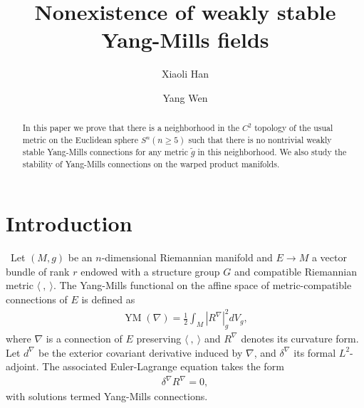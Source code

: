 \documentclass{amsart}
\begin{document}
	\title{Nonexistence of weakly stable Yang-Mills fields}
	\author{Xiaoli Han}
	\address{Xiaoli Han\\ Math department of Tsinghua university\\ Beijing\\ 100084\\ China\\} 
	\author{Yang Wen}
	\address{Yang Wen\\ Beijing International Center for Mathematical Research\\ Peking University\\ Beijing\\ 100871\\ China\\} 
	\begin{abstract}
		In this paper we prove that there is a neighborhood in the  $C^2$ topology of the usual metric on the
		Euclidean sphere $S^n (n\geq 5)$ such that there is no nontrivial weakly stable Yang-Mills connections for any metric $\tilde{g}$ in this neighborhood. We also study the stability of Yang-Mills connections on the warped product manifolds.
	\end{abstract}
	\maketitle
	\section{Introduction}\  
	Let $(M,g)$ be an $n$-dimensional Riemannian manifold and $E\to M$ a vector bundle of rank $r$ endowed with a structure group $G$ and compatible Riemannian metric $\langle\ ,\ \rangle$. The Yang-Mills functional on the affine space of metric-compatible connections of $E$ is defined as
	\begin{align*}
		\operatorname{YM}(\nabla)=\frac12\int_M|R^\nabla|_g^2dV_g,
	\end{align*}
	where $\nabla$ is a connection of $E$ preserving $\langle\ ,\ \rangle$ and $R^\nabla$ denotes its curvature form. Let $d^\nabla$ be the exterior covariant derivative induced by $\nabla$, and $\delta^\nabla$ its formal $L^2$-adjoint. The associated Euler-Lagrange equation takes the form
	\begin{align}\label{YM equation}
		\delta^\nabla R^\nabla=0,
	\end{align}
	with solutions termed Yang-Mills connections. 
	
\end{document}
